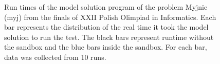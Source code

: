 \documentclass[en]{pracamgr}
\begin{document}
\begin{appendices}
\begin{figure}[H]
\caption{Run times of the model solution program of the problem Myjnie (myj) from the finals of XXII Polish Olimpiad in Informatics. Each bar represents the distribution of the real time it took the model solution to run the test. The black bars represent runtime without the sandbox and the blue bars inside the sandbox. For each bar, data was collected from 10 runs.}
\label{figure:myj_model_solution_real_time}
\end{figure}


\end{appendices}
\end{document}
